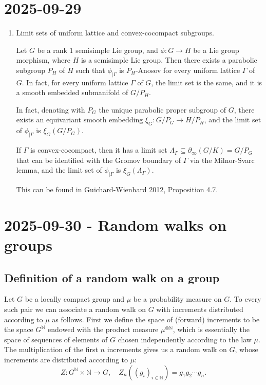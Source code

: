 \documentclass{report}
\begin{document}
\section{2025-09-29}
\begin{enumerate}
    \item Limit sets of uniform lattice and convex-cocompact subgroups.
    
    Let $G$ be a rank $1$ semisimple Lie group, and $\phi: G \to H$ be a Lie group morphism, where $H$ is a semisimple Lie group.
    Then there exists a parabolic subgroup $P_H$ of $H$ such that $\phi_{\mid \Gamma}$ is $P_H$-Anosov for every uniform lattice $\Gamma$ of $G$.
    In fact, for every uniform lattice $\Gamma$ of $G$, the limit set is the same, and it is a smooth embedded submanifold of $G/P_H$.

    In fact, denoting with $P_G$ the unique parabolic proper subgroup of $G$, there exists an equivariant smooth embedding $\xi_G: G/P_G \to H/P_H$, and the limit set of $\phi_{\mid \Gamma}$ is $\xi_G(G/P_G)$.

    If $\Gamma$ is convex-cocompact, then it has a limit set $\Lambda_\Gamma \subseteq \partial_\infty (G/K) = G/P_G$ that can be identified with the Gromov boundary of $\Gamma$ via the Milnor-Svarc lemma, and the limit set of $\phi_{\mid \Gamma}$ is $\xi_G(\Lambda_\Gamma)$.

    This can be found in Guichard-Wienhard 2012, Proposition 4.7.
\end{enumerate}
\section{2025-09-30 - Random walks on groups}
\subsection{Definition of a random walk on a group}
Let $G$ be a locally compact group and $\mu$ be a probability measure on $G$.
To every such pair we can associate a random walk on $G$ with increments distributed according to $\mu$ as follows.
First we define the space of (forward) increments to be the space $G^\mathbb N$ endowed with the product measure $\mu^{\otimes \mathbb N}$, which is essentially the space of sequences of elements of $G$ chosen independently according to the law $\mu$.
The multiplication of the first $n$ increments gives us a random walk on $G$, whose increments are distributed according to $\mu$:
\[
Z: G^\mathbb N \times \mathbb N \to G, \quad Z_n\left((g_i)_{i \in \mathbb N}\right) = g_1 g_2 \cdots g_n.
\]
\end{document}
